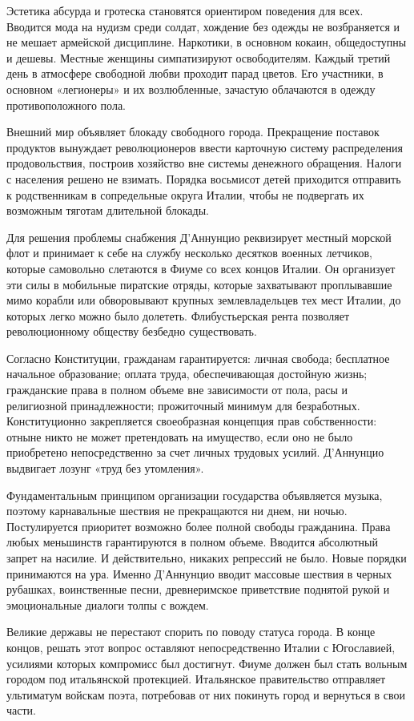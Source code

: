 Эстетика абсурда и гротеска становятся ориентиром поведения для всех. Вводится
мода на нудизм среди солдат, хождение без одежды не возбраняется и не мешает
армейской дисциплине. Наркотики, в основном кокаин, общедоступны и дешевы.
Местные женщины симпатизируют освободителям. Каждый третий день в атмосфере
свободной любви проходит парад цветов. Его участники, в основном «легионеры» и
их возлюбленные, зачастую облачаются в одежду противоположного пола. 

Внешний мир объявляет блокаду свободного города. Прекращение поставок продуктов
вынуждает революционеров ввести карточную систему распределения продовольствия,
построив хозяйство вне системы денежного обращения. Налоги с населения решено
не взимать. Порядка восьмисот детей приходится отправить к родственникам в
сопредельные округа Италии, чтобы не подвергать их возможным тяготам длительной
блокады. 

Для решения проблемы снабжения Д'Аннунцио реквизирует местный морской флот и
принимает к себе на службу несколько десятков военных летчиков, которые
самовольно слетаются в Фиуме со всех концов Италии. Он организует эти силы в
мобильные пиратские отряды, которые захватывают проплывавшие мимо корабли или
обворовывают крупных землевладельцев тех мест Италии, до которых легко можно
было долететь. Флибустьерская рента позволяет революционному обществу безбедно
существовать.

Согласно Конституции, гражданам гарантируется: личная свобода; бесплатное
начальное образование; оплата труда, обеспечивающая достойную жизнь;
гражданские права в полном объеме вне зависимости от пола, расы и религиозной
принадлежности; прожиточный минимум для безработных. Конституционно
закрепляется своеобразная концепция прав собственности: отныне никто не может
претендовать на имущество, если оно не было приобретено непосредственно за счет
личных трудовых усилий. Д'Аннунцио выдвигает лозунг «труд без утомления».

Фундаментальным принципом организации государства объявляется музыка, поэтому
карнавальные шествия не прекращаются ни днем, ни ночью. Постулируется приоритет
возможно более полной свободы гражданина. Права любых меньшинств гарантируются
в полном объеме. Вводится абсолютный запрет на насилие. И действительно,
никаких репрессий не было. Новые порядки принимаются на ура. Именно Д’Аннунцио
вводит массовые шествия в черных рубашках, воинственные песни, древнеримское
приветствие поднятой рукой и эмоциональные диалоги толпы с вождем. 

Великие державы не перестают спорить по поводу статуса города. В конце концов,
решать этот вопрос оставляют непосредственно Италии с Югославией, усилиями
которых компромисс был достигнут. Фиуме должен был стать вольным городом под
итальянской протекцией. Итальянское правительство отправляет ультиматум войскам
поэта, потребовав от них покинуть город и вернуться в свои части. 

